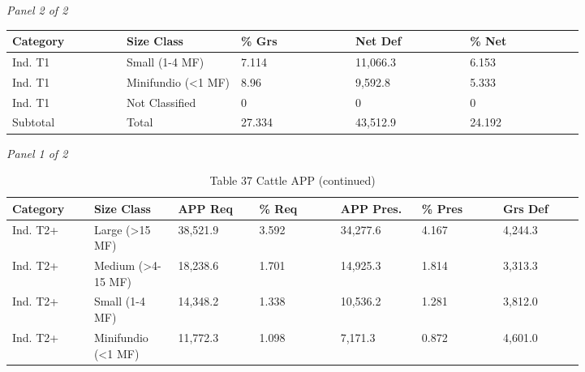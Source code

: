 \documentclass[12pt]{article}
\begin{document}
\begin{landscape}
\begin{table}[H]
\textit{Panel 2 of 2}\\[2pt]
{\fontsize{12}{14}\selectfont
\setlength{\tabcolsep}{3pt}
\renewcommand{\arraystretch}{1.08}
\begin{tabular}{p{0.164\linewidth}p{0.164\linewidth}p{0.164\linewidth}p{0.164\linewidth}p{0.164\linewidth}}
\toprule
Category & Size Class & \% Grs & Net Def & \% Net \\
\midrule
Ind. T1 & Small (1-4 MF) & 7.114 & 11,066.3 & 6.153 \\
Ind. T1 & Minifundio (<1 MF) & 8.96 & 9,592.8 & 5.333 \\
Ind. T1 & Not Classified & 0 & 0 & 0 \\
Subtotal & Total & 27.334 & 43,512.9 & 24.192 \\
\bottomrule
\end{tabular}
}
\end{table}
\begin{table}[H]
\centering
\caption{Table 37 Cattle APP (continued)}
\textit{Panel 1 of 2}\\[2pt]
{\fontsize{12}{14}\selectfont
\setlength{\tabcolsep}{3pt}
\renewcommand{\arraystretch}{1.08}
\begin{tabular}{p{0.117\linewidth}p{0.117\linewidth}p{0.117\linewidth}p{0.117\linewidth}p{0.117\linewidth}p{0.117\linewidth}p{0.117\linewidth}}
\toprule
Category & Size Class & APP Req & \% Req & APP Pres. & \% Pres & Grs Def \\
\midrule
Ind. T2+ & Large (>15 MF) & 38,521.9 & 3.592 & 34,277.6 & 4.167 & 4,244.3 \\
Ind. T2+ & Medium (>4-15 MF) & 18,238.6 & 1.701 & 14,925.3 & 1.814 & 3,313.3 \\
Ind. T2+ & Small (1-4 MF) & 14,348.2 & 1.338 & 10,536.2 & 1.281 & 3,812.0 \\
Ind. T2+ & Minifundio (<1 MF) & 11,772.3 & 1.098 & 7,171.3 & 0.872 & 4,601.0 \\
\bottomrule
\end{tabular}
}

\vspace{0.6em}


\end{table}
\end{landscape}
\end{document}
